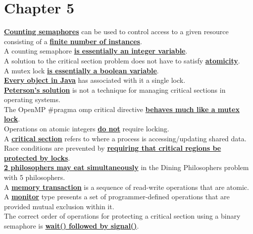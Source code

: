 \documentclass[10pt]{article}
\newcommand{\qw}[1]{\textbf{\ul{#1}}}
\begin{document}
\section*{\centering Chapter 5}
\qw{Counting semaphores} can be used to control access to a given resource consisting of a \qw{finite number of instances}.\\[2mm]
A counting semaphore \qw{is essentially an integer variable}.\\[2mm]
A solution to the critical section problem does not have to satisfy \qw{atomicity}.\\[2mm]
A mutex lock \qw{is essentially a boolean variable}.\\[2mm]
\qw{Every object in Java} has associated with it a single lock.\\[2mm]
\qw{Peterson's solution} is not a technique for managing critical sections in operating systems.\\[2mm]
The OpenMP \#pragma omp critical directive \qw{behaves much like a mutex lock}.\\[2mm]
Operations on atomic integers \qw{do not} require locking.\\[2mm]
A \qw{critical section} refers to where a process is accessing/updating shared data.\\[2mm]
Race conditions are prevented by \qw{requiring that critical regions be protected by locks}.\\[2mm]
\qw{2 philosophers may eat simultaneously} in the Dining Philosophers problem with 5 philosophers.\\[2mm]
A \qw{memory transaction} is a sequence of read-write operations that are atomic.\\[2mm]
A \qw{monitor} type presents a set of programmer-defined operations that are provided mutual exclusion within it.\\[2mm]
The correct order of operations for protecting a critical section using a binary semaphore is \qw{wait() followed by signal()}.
\end{document}
